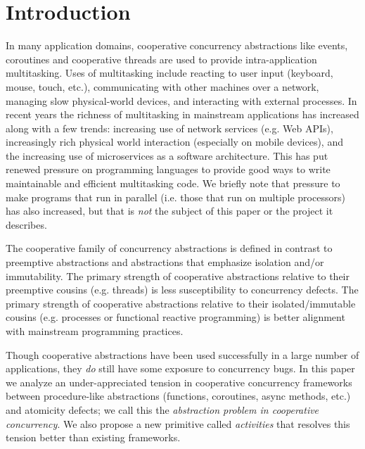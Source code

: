 \documentclass[preprint, 10pt, numbers]{sigplanconf}
\begin{document}




\section{Introduction}

In many application domains, cooperative concurrency abstractions like events, coroutines and cooperative threads are used to provide intra-application multitasking.
Uses of multitasking include reacting to user input (keyboard, mouse, touch, etc.), communicating with other machines over a network, managing slow physical-world devices, and interacting with external processes.
In recent years the richness of multitasking in mainstream applications has increased along with a few trends: increasing use of network services (e.g. Web APIs), increasingly rich physical world interaction (especially on mobile devices), and the increasing use of microservices as a software architecture.
This has put renewed pressure on programming languages to provide good ways to write maintainable and efficient multitasking code.
We briefly note that pressure to make programs that run in parallel (i.e. those that run on multiple processors) has also increased, but that is \emph{not} the subject of this paper or the project it describes.

The cooperative family of concurrency abstractions is defined in contrast to preemptive abstractions and abstractions that emphasize isolation and/or immutability.
The primary strength of cooperative abstractions relative to their preemptive cousins (e.g. threads) is less susceptibility to concurrency defects.
The primary strength of cooperative abstractions relative to their isolated/immutable cousins (e.g. processes or functional reactive programming) is better alignment with mainstream programming practices.

Though cooperative abstractions have been used successfully in a large number of applications, they \emph{do} still have some exposure to concurrency bugs.
In this paper we analyze an under-appreciated tension in cooperative concurrency frameworks between procedure-like abstractions (functions, coroutines, async methods, etc.) and atomicity defects; we call this the \emph{abstraction problem in cooperative concurrency}.
We also propose a new primitive called \emph{activities} that resolves this tension better than existing frameworks.
\end{document}
